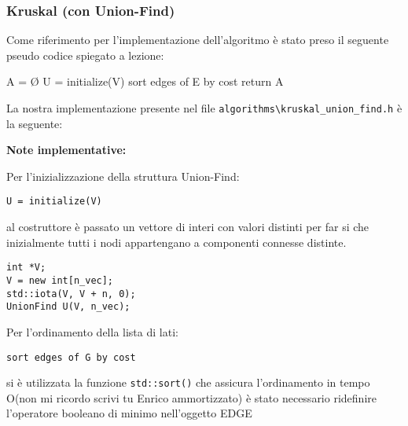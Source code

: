 \documentclass[]{article}
\begin{document}
\subsubsection{Kruskal (con Union-Find)}
\begin{flushleft}
Come riferimento per l'implementazione dell'algoritmo è stato preso il seguente pseudo codice spiegato a lezione:

\begin{algorithm}[H]
\SetAlgoLined
\DontPrintSemicolon
{}
	A = Ø\;
	U = initialize(V)\;
	sort edges of E by cost\;
	return A\;
\caption{Kruskal Naive}
\end{algorithm}
La nostra implementazione presente nel file \verb|algorithms\kruskal_union_find.h| è la seguente:

\lstset{language=c++, style=mystyle}


\textbf{Note implementative:}

\medskip
Per l'inizializzazione della struttura Union-Find:

\begin{lstlisting}
U = initialize(V)
\end{lstlisting}

\smallskip
al costruttore è passato un vettore di interi con valori distinti per far si che inizialmente tutti i nodi appartengano a componenti connesse distinte.

\lstset{language=c++, style=mystyle, firstnumber=4}  	 	
\begin{lstlisting}
int *V;
V = new int[n_vec];
std::iota(V, V + n, 0);
UnionFind U(V, n_vec);
\end{lstlisting}

\medskip
Per l'ordinamento della lista di lati:

\begin{lstlisting}
sort edges of G by cost
\end{lstlisting}

\smallskip
si è utilizzata la funzione \verb|std::sort()| che assicura l'ordinamento in tempo O(non mi ricordo scrivi tu Enrico ammortizzato)%
 è stato necessario ridefinire l'operatore booleano di minimo nell'oggetto EDGE
 

\end{flushleft}
\end{document}
